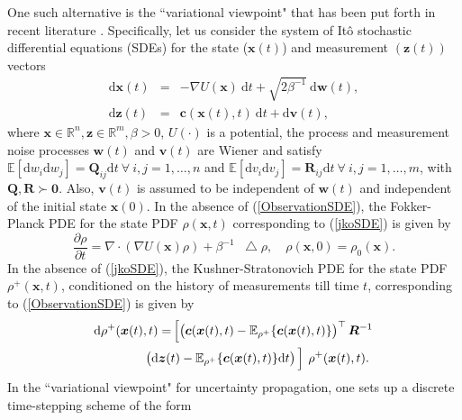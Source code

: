 \documentclass[letterpaper,10pt,twocolumn,conference]{ieeeconf}
\newcommand*\Laplacian{\mathop{}\!\mathbin\bigtriangleup}
\newcommand{\bbc}{\bm{c}}
\newcommand{\bbv}{\bm{v}}
\newcommand{\bbw}{\bm{w}}
\newcommand{\bbx}{{\bm{x}}}
\newcommand{\bbz}{\bm{z}}
\newcommand{\bbR}{\bm{R}}
\newcommand{\bbQ}{\bm{Q}}
\begin{document}
One such alternative is the ``variational viewpoint" that has been put forth in recent literature \cite{JKO1998,LaugesenMehta2015}. Specifically, let us consider the system of It\^{o} stochastic differential equations (SDEs) for the state ($\bbx(t)$) and measurement $(\bbz(t))$ vectors
\begin{subequations}
\begin{eqnarray}
\mathrm{d}\bm{x}(t) &=& -\nabla U(\bm{x})\:\mathrm{d}t + \sqrt{2\beta^{-1}}\:\mathrm{d}\bm{w}(t),
\label{jkoSDE}\\
\mathrm{d}\bbz(t) &=& \bbc(\bm{x}(t),t)\:\mathrm{d}t + \mathrm{d}\bbv(t), 
\label{ObservationSDE}	
\end{eqnarray}
\label{CanonicalForm}
\end{subequations}
where $\bbx\in\mathbb{R}^{n}, \bbz\in\mathbb{R}^{m}, \beta>0$, $U(\cdot)$ is a potential, the process and measurement noise processes $\bbw(t)$ and $\bbv(t)$ are Wiener and satisfy $\mathbb{E}\left[\mathrm{d}w_{i}\mathrm{d}w_{j}\right] = \bbQ_{ij}\mathrm{d}t \:\forall\:i,j=1,\hdots,n$ and $\mathbb{E}\left[\mathrm{d}v_{i}\mathrm{d}v_{j}\right] = \bbR_{ij}\mathrm{d}t \:\forall\:i,j=1,\hdots,m$, with $\bbQ,\bbR \succ \bm{0}$. Also, $\bbv(t)$ is assumed to be independent of  $\bbw(t)$ and independent of the initial state $\bm{x}(0)$. In the absence of (\ref{ObservationSDE}), the Fokker-Planck PDE for the state PDF	$\rho(\bbx,t)$ corresponding to (\ref{jkoSDE}) is given by
\begin{equation}\label{eq:FP}
\frac{\partial\rho}{\partial t} = \nabla\cdot\left(\nabla U(\bm{x})\rho\right) + \beta^{-1}\Laplacian\rho, \quad \rho(\bm{x},0)=\rho_0(\bm{x}).
\end{equation} 
In the absence of (\ref{jkoSDE}), the Kushner-Stratonovich PDE \cite{Stratonovich1960,Kushner1964} for the state PDF	 $\rho^{+}(\bbx,t)$, conditioned on the history of measurements till time $t$, corresponding to (\ref{ObservationSDE}) is given by 
\begin{align}
\mathrm{d}\rho^{+}(\bbx(t),t) =& \left[ \left(\bbc(\bbx(t),t) - \mathbb{E}_{\rho^{+}}\{\bbc(\bbx(t),t)\}\right)^{\top} \bbR^{-1} \right.\nonumber\\
&\!\!\!\!\!\!\!\!\!\!\!\!\!\!\left.\left(\mathrm{d}\bbz(t) - \mathbb{E}_{\rho^{+}}\{\bbc(\bbx(t),t)\}\mathrm{d}t\right)\vphantom{\left(\bbc(\bbx(t),t) - \mathbb{E}_{\rho^{+}}\{\bbc(\bbx(t),t)\}\right)^{\top}}\right]\: \rho^{+}(\bbx(t),t).
\label{KSpde}
\end{align}
In the ``variational viewpoint" for uncertainty propagation, one sets up a discrete time-stepping scheme of the form
\end{document}
